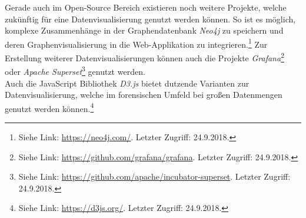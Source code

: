 \noindent
Gerade auch im Open-Source Bereich existieren noch weitere Projekte, welche zukünftig für eine Datenvisualisierung genutzt werden können. So ist es möglich, komplexe Zusammenhänge in der Graphendatenbank \textit{Neo4j} zu speichern und deren Graphenvisualisierung in die Web-Applikation zu integrieren.\footnote{Siehe Link: \url{https://neo4j.com/}. Letzter Zugriff: 24.9.2018.} Zur Erstellung weiterer Datenvisualisierungen können auch die Projekte \textit{Grafana}\footnote{Siehe Link: \url{https://github.com/grafana/grafana}. Letzter Zugriff: 24.9.2018.} oder \textit{Apache Superset}\footnote{Siehe Link: \url{https://github.com/apache/incubator-superset}. Letzter Zugriff: 24.9.2018.} genutzt werden.\\
Auch die JavaScript Bibliothek \textit{D3.js} bietet dutzende Varianten zur Datenvisualisierung, welche im forensischen Umfeld bei großen Datenmengen genutzt werden können.\footnote{Siehe Link: \url{https://d3js.org/}. Letzter Zugriff: 24.9.2018.}\\




